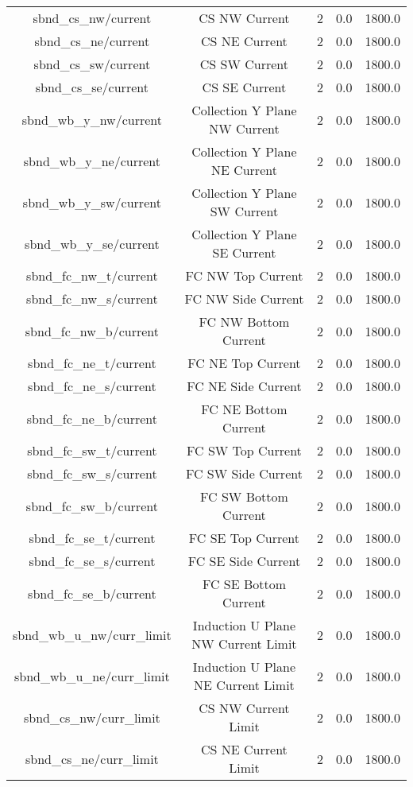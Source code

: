 \begin{center}
\begin{longtable}{c | c c c c }
sbnd\_cs\_nw/current & CS NW Current & 2 & 0.0 & 1800.0\\ 
sbnd\_cs\_ne/current & CS NE Current & 2 & 0.0 & 1800.0\\ 
sbnd\_cs\_sw/current & CS SW Current & 2 & 0.0 & 1800.0\\ 
sbnd\_cs\_se/current & CS SE Current & 2 & 0.0 & 1800.0\\ 
sbnd\_wb\_y\_nw/current & Collection Y Plane NW Current & 2 & 0.0 & 1800.0\\ 
sbnd\_wb\_y\_ne/current & Collection Y Plane NE Current & 2 & 0.0 & 1800.0\\ 
sbnd\_wb\_y\_sw/current & Collection Y Plane SW Current & 2 & 0.0 & 1800.0\\ 
sbnd\_wb\_y\_se/current & Collection Y Plane SE Current & 2 & 0.0 & 1800.0\\ 
sbnd\_fc\_nw\_t/current & FC NW Top Current & 2 & 0.0 & 1800.0\\ 
sbnd\_fc\_nw\_s/current & FC NW Side Current & 2 & 0.0 & 1800.0\\ 
sbnd\_fc\_nw\_b/current & FC NW Bottom Current & 2 & 0.0 & 1800.0\\ 
sbnd\_fc\_ne\_t/current & FC NE Top Current & 2 & 0.0 & 1800.0\\ 
sbnd\_fc\_ne\_s/current & FC NE Side Current & 2 & 0.0 & 1800.0\\ 
sbnd\_fc\_ne\_b/current & FC NE Bottom Current & 2 & 0.0 & 1800.0\\ 
sbnd\_fc\_sw\_t/current & FC SW Top Current & 2 & 0.0 & 1800.0\\ 
sbnd\_fc\_sw\_s/current & FC SW Side Current & 2 & 0.0 & 1800.0\\ 
sbnd\_fc\_sw\_b/current & FC SW Bottom Current & 2 & 0.0 & 1800.0\\ 
sbnd\_fc\_se\_t/current & FC SE Top Current & 2 & 0.0 & 1800.0\\ 
sbnd\_fc\_se\_s/current & FC SE Side Current & 2 & 0.0 & 1800.0\\ 
sbnd\_fc\_se\_b/current & FC SE Bottom Current & 2 & 0.0 & 1800.0\\ 
sbnd\_wb\_u\_nw/curr\_limit & Induction U Plane NW Current Limit & 2 & 0.0 & 1800.0\\ 
sbnd\_wb\_u\_ne/curr\_limit & Induction U Plane NE Current Limit & 2 & 0.0 & 1800.0\\ 
sbnd\_cs\_nw/curr\_limit & CS NW Current Limit & 2 & 0.0 & 1800.0\\ 
sbnd\_cs\_ne/curr\_limit & CS NE Current Limit & 2 & 0.0 & 1800.0\\ 

\end{longtable}
\end{center}

